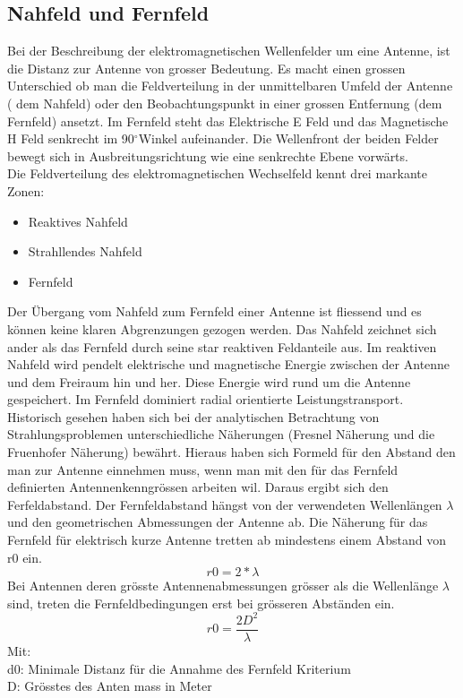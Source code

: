 \subsection{Nahfeld und Fernfeld}
Bei der Beschreibung der elektromagnetischen Wellenfelder um eine Antenne, ist die Distanz zur Antenne von grosser Bedeutung. Es macht einen grossen Unterschied ob man die Feldverteilung in der unmittelbaren Umfeld der Antenne ( dem Nahfeld) oder den Beobachtungspunkt in einer grossen Entfernung (dem Fernfeld) ansetzt.
Im Fernfeld steht das Elektrische E Feld  und das Magnetische H Feld senkrecht  im 90$^\circ$Winkel aufeinander. Die Wellenfront der beiden Felder bewegt sich in Ausbreitungsrichtung wie eine senkrechte Ebene vorwärts.\\
Die Feldverteilung des elektromagnetischen Wechselfeld kennt drei markante Zonen:
\begin{itemize}
\item Reaktives Nahfeld
\item Strahllendes Nahfeld 
\item Fernfeld
\end{itemize}
 Der Übergang vom Nahfeld zum Fernfeld einer Antenne ist fliessend und es können keine klaren Abgrenzungen gezogen werden. Das Nahfeld zeichnet sich ander als das Fernfeld durch seine star reaktiven Feldanteile aus. Im reaktiven Nahfeld wird pendelt elektrische und magnetische Energie zwischen der Antenne und dem Freiraum hin und her. Diese Energie wird rund um die Antenne gespeichert.
Im Fernfeld dominiert radial orientierte Leistungstransport. 
\\Historisch gesehen haben sich bei der  analytischen Betrachtung von Strahlungsproblemen unterschiedliche Näherungen (Fresnel Näherung und die Fruenhofer Näherung) bewährt. Hieraus haben sich Formeld für den Abstand den man zur Antenne einnehmen muss, wenn man mit den für das Fernfeld definierten Antennenkenngrössen arbeiten wil. Daraus ergibt sich den Ferfeldabstand. Der Fernfeldabstand hängst von der verwendeten Wellenlängen $\lambda$ und den geometrischen Abmessungen der Antenne ab. Die Näherung für das Fernfeld für elektrisch kurze Antenne tretten ab mindestens einem Abstand von r0 ein.
\[r0=2*\lambda\]
Bei Antennen deren grösste Antennenabmessungen grösser als die Wellenlänge $\lambda$ sind, treten die Fernfeldbedingungen erst bei grösseren Abständen ein.
\[r0=\dfrac{2D^2}{\lambda}\]
Mit:\\d0: Minimale Distanz für die Annahme des Fernfeld Kriterium\\
D: Grösstes des Anten mass in Meter\\

